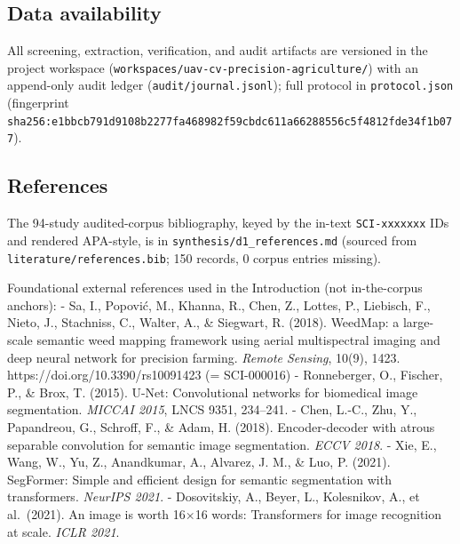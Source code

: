\documentclass[11pt]{article}
\begin{document}
\subsection{Data availability}\label{data-availability}

All screening, extraction, verification, and audit artifacts are
versioned in the project workspace
(\texttt{workspaces/uav-cv-precision-agriculture/}) with an append-only
audit ledger (\texttt{audit/journal.jsonl}); full protocol in
\texttt{protocol.json} (fingerprint
\texttt{sha256:e1bbcb791d9108b2277fa468982f59cbdc611a66288556c5f4812fde34f1b077}).

\subsection{References}\label{references}

The 94-study audited-corpus bibliography, keyed by the in-text
\texttt{SCI-xxxxxxx} IDs and rendered APA-style, is in
\texttt{synthesis/d1\_references.md} (sourced from
\texttt{literature/references.bib}; 150 records, 0 corpus entries
missing).

Foundational external references used in the Introduction (not
in-the-corpus anchors): - Sa, I., Popović, M., Khanna, R., Chen, Z.,
Lottes, P., Liebisch, F., Nieto, J., Stachniss, C., Walter, A., \&
Siegwart, R. (2018). WeedMap: a large-scale semantic weed mapping
framework using aerial multispectral imaging and deep neural network for
precision farming. \emph{Remote Sensing}, 10(9), 1423.
https://doi.org/10.3390/rs10091423 (= SCI-000016) - Ronneberger, O.,
Fischer, P., \& Brox, T. (2015). U-Net: Convolutional networks for
biomedical image segmentation. \emph{MICCAI 2015}, LNCS 9351, 234--241.
- Chen, L.-C., Zhu, Y., Papandreou, G., Schroff, F., \& Adam, H. (2018).
Encoder-decoder with atrous separable convolution for semantic image
segmentation. \emph{ECCV 2018}. - Xie, E., Wang, W., Yu, Z., Anandkumar,
A., Alvarez, J. M., \& Luo, P. (2021). SegFormer: Simple and efficient
design for semantic segmentation with transformers. \emph{NeurIPS 2021}.
- Dosovitskiy, A., Beyer, L., Kolesnikov, A., et al.~(2021). An image is
worth 16×16 words: Transformers for image recognition at scale.
\emph{ICLR 2021}.
\end{document}
